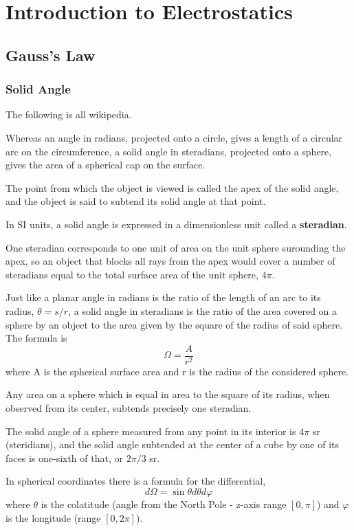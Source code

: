 \section{Introduction to Electrostatics}

\subsection{Gauss's Law}

\subsubsection{Solid Angle}

The following is all wikipedia.

Whereas an angle in radians, projected onto a circle, gives a length of a circular arc
on the circumference, a solid angle in steradians, projected onto a sphere,
gives the area of a spherical cap on the surface.

The point from which the object is viewed is called the apex of the solid angle,
and the object is said to subtend its solid angle at that point.

In SI units, a solid angle is expressed in a dimensionless unit called a \textbf{steradian}.

One steradian corresponds to one unit of area on the unit sphere surounding the apex,
so an object that blocks all rays from the apex would cover a number of steradians equal
to the total surface area of the unit sphere, $4\pi$.


Just like a planar angle in radians is the ratio of the length of an arc to its radius, $\theta = s/r$,
a solid angle in steradians is the ratio of the area covered on a sphere by an object to the area given
by the square of the radius of said sphere. The formula is
$$
\Omega = \frac{A}{r^2}
$$
where A is the spherical surface area and r is the radius of the considered sphere.

Any area on a sphere which is equal in area to the square of its radius,
when observed from its center, subtends precisely one steradian.

The solid angle of a sphere measured from any point in its interior is $4\pi$ sr (steridians),
and the solid angle subtended at the center of a cube by one of its faces is one-sixth of that,
or $2\pi/3$ sr.

In spherical coordinates there is a formula for the differential,
$$
d\Omega = \sin \theta d\theta d\varphi 
$$
where $\theta$ is the colatitude (angle from the North Pole - z-axis range $[0,\pi]$)
and $\varphi$ is the longitude (range $[0,2\pi]$).

